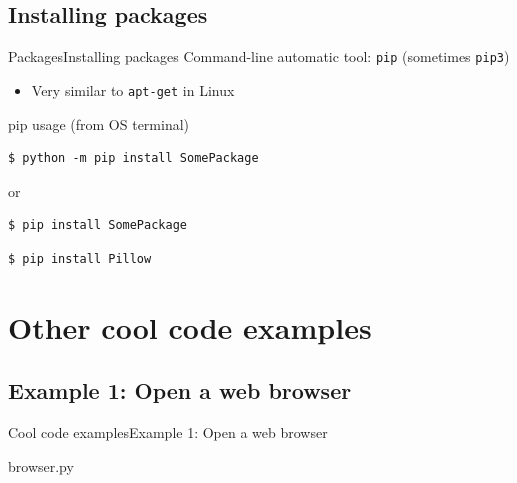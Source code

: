 \documentclass[10pt,compress]{beamer} %
\begin{document}
\subsection{Installing packages}
\begin{frame}[fragile]{Packages}{Installing packages}
	Command-line automatic tool: \texttt{pip} (sometimes \texttt{pip3})
		\begin{itemize}
			\item Very similar to \texttt{apt-get} in Linux
		\end{itemize}

	\begin{block}{pip usage (from OS terminal)}
	\vspace{-0.2cm}
	\begin{verbatim}
$ python -m pip install SomePackage
\end{verbatim}
or
	\begin{verbatim}
$ pip install SomePackage
\end{verbatim}
	\vspace{-0.2cm}
\end{block}

	\begin{exampleblock}{}
	\vspace{-0.2cm}
	\begin{verbatim}
$ pip install Pillow
\end{verbatim}
	\vspace{-0.2cm}
\end{exampleblock}
\end{frame}

\section{Other cool code examples}

\subsection{Example 1: Open a web browser}
\begin{frame}{Cool code examples}{Example 1: Open a web browser}
	\vspace{-0.2cm}
	\begin{block}{browser.py}
	\vspace{-0.2cm}
	
	\vspace{-0.2cm}
	\end{block}
\end{frame}
\end{document}
